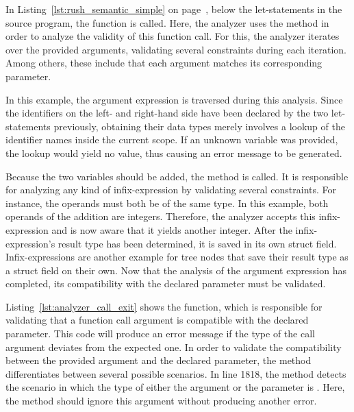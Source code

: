 In Listing~\ref{lst:rush_semantic_simple} on page~\pageref{lst:rush_semantic_simple}, below the let-statements in the source program, the  function is called.
Here, the analyzer uses the  method in order to analyze the validity of this function call.
For this, the analyzer iterates over the provided arguments, validating several constraints during each iteration.
Among others, these include that each argument matches its corresponding parameter.

In this example, the argument expression  is traversed during this analysis.
Since the identifiers on the left- and right-hand side have been declared by the two let-statements previously,
obtaining their data types merely involves a lookup of the identifier names inside the current scope.
If an unknown variable was provided, the lookup would yield no value, thus causing an error message to be generated.

Because the two variables should be added, the  method is called.
It is responsible for analyzing any kind of infix-expression by validating several constraints.
For instance, the operands must both be of the same type.
In this example, both operands of the addition are integers.
Therefore, the analyzer accepts this infix-expression and is now aware that it yields another integer.
After the infix-expression's result type has been determined, it is saved in its own  struct field.
Infix-expressions are another example for tree nodes that save their result type as a struct field on their own.
Now that the analysis of the argument expression has completed, its compatibility with the declared parameter must be validated.


Listing~\ref{lst:analyzer_call_exit} shows the  function, which is responsible for validating that a function call argument is compatible with the declared parameter.
This code will produce an error message if the type of the call argument deviates from the expected one.
In order to validate the compatibility between the provided argument and the declared parameter, the method differentiates between several possible scenarios.
In line 1818, the method detects the scenario in which the type of either the argument or the parameter is .
Here, the method should ignore this argument without producing another error.

